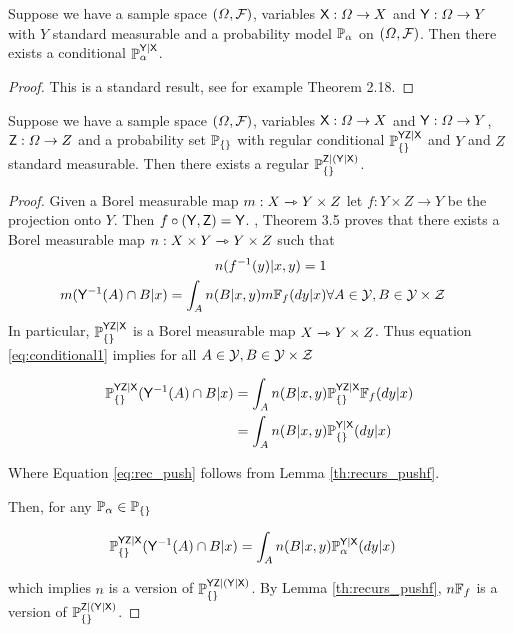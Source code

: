 \begin{theorem}
Suppose we have a sample space $(\Omega,\mathcal{F})$, variables $\mathsf{X}:\Omega\to X$ and $\mathsf{Y}:\Omega\to Y$ with $Y$ standard measurable and a probability model $\mathbb{P}_{\alpha}$ on $(\Omega,\mathcal{F})$. Then there exists a conditional $\mathbb{P}_\alpha^{\mathsf{Y}|\mathsf{X}}$.
\end{theorem}

\begin{proof}
This is a standard result, see for example \cite{cinlar_probability_2011} Theorem 2.18.
\end{proof}

\begin{theorem}\label{th:ho_cond_psets}
Suppose we have a sample space $(\Omega,\mathcal{F})$, variables $\mathsf{X}:\Omega\to X$ and $\mathsf{Y}:\Omega\to Y$, $\mathsf{Z}:\Omega\to Z$ and a probability set $\mathbb{P}_{\{\}}$ with regular conditional $\mathbb{P}_{\{\}}^{\mathsf{YZ}|\mathsf{X}}$ and $Y$ and $Z$ standard measurable. Then there exists a regular $\mathbb{P}_{\{\}}^{\mathsf{Z}|(\mathsf{Y}|\mathsf{X})}$.
\end{theorem}

\begin{proof}
Given a Borel measurable map $m:X\rightarrowtriangle Y\times Z$ let $f:Y\times Z\to Y$ be the projection onto $Y$. Then $f\circ (\mathsf{Y},\mathsf{Z})=\mathsf{Y}$. \citet{bogachev_kantorovich_2020}, Theorem 3.5 proves that there exists a Borel measurable map $n:X\times Y\rightarrowtriangle Y\times Z$  such that 
\begin{align}
    n(f^{-1}(y)|x,y) = 1\label{eq:proper}\\
    m(\mathsf{Y}^{-1}(A)\cap B|x) = \int_A n(B|x,y) m\mathbb{F}_{f}(dy|x)&\forall A\in \mathcal{Y},B\in\mathcal{Y\times Z}\label{eq:conditional1}
\end{align}
In particular, $\mathbb{P}_{\{\}}^{\mathsf{YZ}|\mathsf{X}}$ is a Borel measurable map $X\rightarrowtriangle Y\times Z$. Thus equation \ref{eq:conditional1} implies for all $A\in \mathcal{Y},B\in\mathcal{Y\times Z}$

\begin{align}
    \mathbb{P}_{\{\}}^{\mathsf{YZ}|\mathsf{X}}(\mathsf{Y}^{-1}(A)\cap B|x) &= \int_A n(B|x,y) \mathbb{P}_{\{\}}^{\mathsf{YZ}|\mathsf{X}}\mathbb{F}_{f}(dy|x)\\
    &=\int_A n(B|x,y) \mathbb{P}_{\{\}}^{\mathsf{Y}|\mathsf{X}}(dy|x)\label{eq:rec_push}
\end{align}

Where Equation \ref{eq:rec_push} follows from Lemma \ref{th:recurs_pushf}.

Then, for any $\mathbb{P}_\alpha\in\mathbb{P}_{\{\}}$

\begin{align}
    \mathbb{P}_{\{\}}^{\mathsf{YZ}|\mathsf{X}}(\mathsf{Y}^{-1}(A)\cap B|x) &= \int_A n(B|x,y) \mathbb{P}_{\alpha}^{\mathsf{Y}|\mathsf{X}}(dy|x)
\end{align}

which implies $n$ is a version of $\mathbb{P}_{\{\}}^{\mathsf{YZ}|(\mathsf{Y}|\mathsf{X})}$. By Lemma \ref{th:recurs_pushf}, $n\mathbb{F}_{f}$ is a version of $\mathbb{P}_{\{\}}^{\mathsf{Z}|(\mathsf{Y}|\mathsf{X})}$.
\end{proof}

